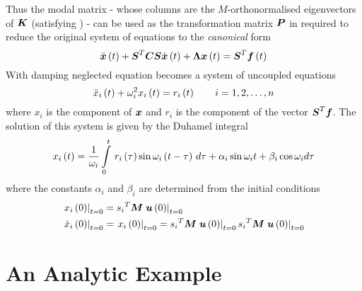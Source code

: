 Thus the modal matrix - whose columns are the $M$-orthonormalised eigenvectors
of $\matr{K}$ (\ie satisfying ) - can be used as the
transformation matrix $\matr{P}$ in  required to reduce the
original system of equations  to the \emph{canonical} form
\begin{equation}
  \fnof{\ddot{\vect{x}}}{t} + 
        \transpose{\matr{S}}\matr{C}\matr{S}\fnof{\dot{\vect{x}}}{t} +
  \matr{\Lambda}\fnof{\vect{x}}{t} 
        = \transpose{\matr{S}}\fnof{\vect{f}}{t}
  \label{eqn:canon}
\end{equation}
With damping neglected equation  becomes a system of
uncoupled equations
\begin{equation}
   \ddot{x}_{i}\left( t \right)  + \omega_{i}^{2} x_{i}\left( t \right)  =  r_{i}\left( t \right) 
  \qquad i=1,2,\ldots, n
  \label{eqn:uncoup}
\end{equation}
where $x_{i}$ is the  component of $\vect{x}$ and $r_{i}$ is the 
component of the vector $\transpose{\matr{S}}\vect{f}$. The solution of this
system is given by the Duhamel integral  
\begin{equation}
   x_{i}\left( t \right) =\dfrac{1}{\omega_{i}}  \displaystyle\int\limits_{0}^{t} \, r_{i}\left( \tau \right) \sin \omega_{i}\left( t-\tau \right) \,d\tau 
  +\alpha_{i}\sin\omega_{i}t+\beta_{i}\cos\omega_{i} d\tau
 \label{eqn:Duh}
\end{equation}
where the constants $\alpha_{i}$ and $\beta_{i}$ are determined from the
initial conditions
\begin{gather}
  \begin{aligned}
    \evalat{\fnof{x_{i}}{0}}{t=0} &= \transpose{{s}_{i}}\matr{M}
      \evalat{\fnof{\vect{u}}{0}}{t=0} \\
    \evalat{\fnof{\dot{x}_{i}}{0}}{t=0} &= \evalat{\fnof{x_{i}}{0}}{t=0} 
                = \transpose{{s}_{i}}\matr{M}\evalat{\fnof{\vect{u}}{0}}{t=0} 
      \transpose{{s}_{i}}\matr{M}\evalat{\fnof{\vect{u}}{0}}{t=0}
  \label{eqn:incond}
  \end{aligned}
\end{gather}

%
%
%
%
%
%

\section{An Analytic Example}


